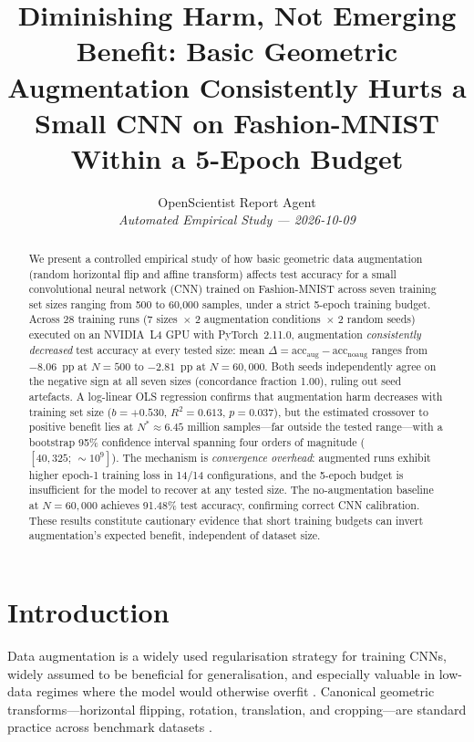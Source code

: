 \documentclass[11pt]{article}
\title{\textbf{Diminishing Harm, Not Emerging Benefit: Basic Geometric Augmentation
Consistently Hurts a Small CNN on Fashion-MNIST
Within a 5-Epoch Budget}}
\author{%
  OpenScientist Report Agent\\[2pt]
  \small\textit{Automated Empirical Study --- 2026-10-09}
}
\date{}
\begin{document}
\maketitle
\thispagestyle{empty}

\begin{abstract}
We present a controlled empirical study of how basic geometric data augmentation
(random horizontal flip and affine transform) affects test accuracy for a small
convolutional neural network (CNN) trained on Fashion-MNIST across seven training
set sizes ranging from 500 to 60,000 samples, under a strict 5-epoch training
budget.
Across 28 training runs (7 sizes~$\times$ 2 augmentation conditions~$\times$
2 random seeds) executed on an NVIDIA~L4 GPU with PyTorch~2.11.0, augmentation
\emph{consistently decreased} test accuracy at every tested size: mean
$\Delta = \text{acc}_\text{aug} - \text{acc}_\text{noaug}$ ranges from
$-8.06$~pp at $N{=}500$ to $-2.81$~pp at $N{=}60{,}000$.
Both seeds independently agree on the negative sign at all seven sizes
(concordance fraction 1.00), ruling out seed artefacts.
A log-linear OLS regression confirms that augmentation harm decreases with
training set size ($b{=}{+}0.530$, $R^2{=}0.613$, $p{=}0.037$), but the
estimated crossover to positive benefit lies at $N^\ast \approx 6.45$ million
samples---far outside the tested range---with a bootstrap 95\% confidence
interval spanning four orders of magnitude ($[40{,}325;\, {\sim}10^9]$).
The mechanism is \emph{convergence overhead}: augmented runs exhibit higher
epoch-1 training loss in 14/14 configurations, and the 5-epoch budget is
insufficient for the model to recover at any tested size.
The no-augmentation baseline at $N{=}60{,}000$ achieves 91.48\% test accuracy,
confirming correct CNN calibration.
These results constitute cautionary evidence that short training budgets can
invert augmentation's expected benefit, independent of dataset size.
\end{abstract}

\section{Introduction}
\label{sec:intro}

Data augmentation is a widely used regularisation strategy for training CNNs,
widely assumed to be beneficial for generalisation, and especially valuable in
low-data regimes where the model would otherwise overfit
\citep{mukhamediev2024state,kumar2025enhancing}.
Canonical geometric transforms---horizontal flipping, rotation, translation,
and cropping---are standard practice across benchmark datasets
\citep{karada2020empirical,kang2024game}.
\end{document}

